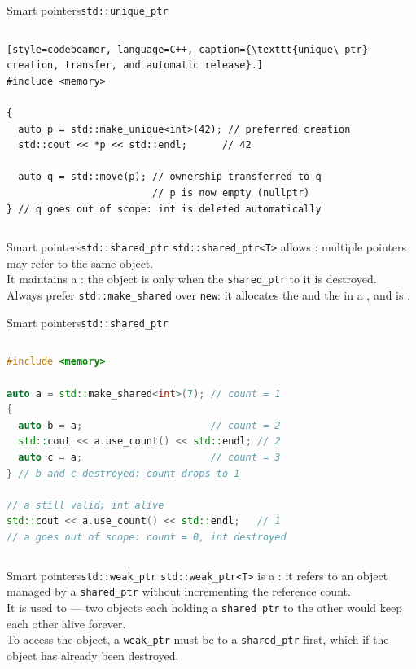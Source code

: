 \begin{frame}[fragile]{Smart pointers}{\texttt{std::unique\_ptr}}
  \begin{columns}
		\begin{lstlisting}[style=codebeamer, language=C++, caption={\texttt{unique\_ptr} creation, transfer, and automatic release}.]
#include <memory>

{
  auto p = std::make_unique<int>(42); // preferred creation
  std::cout << *p << std::endl;      // 42

  auto q = std::move(p); // ownership transferred to q
                         // p is now empty (nullptr)
} // q goes out of scope: int is deleted automatically
    \end{lstlisting}
	\end{columns}
\end{frame}
\begin{frame}[fragile]{Smart pointers}{\texttt{std::shared\_ptr}}
	\justifying
	\texttt{std::shared\_ptr<T>} allows : multiple pointers may refer to the same object.\\
  \bigskip
	It maintains a : the object is  only when the  \texttt{shared\_ptr} to it is destroyed.\\
  \bigskip
	Always prefer \texttt{std::make\_shared} over \texttt{new}: it allocates the  and the  in a , and is .
\end{frame}
\begin{frame}[fragile]{Smart pointers}{\texttt{std::shared\_ptr}}
  \begin{columns}
		\begin{lstlisting}[style=codebeamer, language=C++, caption=Reference counting with \texttt{shared\_ptr}.]
#include <memory>

auto a = std::make_shared<int>(7); // count = 1
{
  auto b = a;                      // count = 2
  std::cout << a.use_count() << std::endl; // 2
  auto c = a;                      // count = 3
} // b and c destroyed: count drops to 1

// a still valid; int alive
std::cout << a.use_count() << std::endl;   // 1
// a goes out of scope: count = 0, int destroyed
    \end{lstlisting}
	\end{columns}
\end{frame}
\begin{frame}{Smart pointers}{\texttt{std::weak\_ptr}}
	\justifying
	\texttt{std::weak\_ptr<T>} is a : it refers to an object managed by a \texttt{shared\_ptr} without incrementing the reference count.\\
	\bigskip
	It is used to  — two objects each holding a \texttt{shared\_ptr} to the other would keep each other alive forever.\\
	\bigskip
	To access the object, a \texttt{weak\_ptr} must be  to a \texttt{shared\_ptr} first, which  if the object has already been destroyed.
\end{frame}
